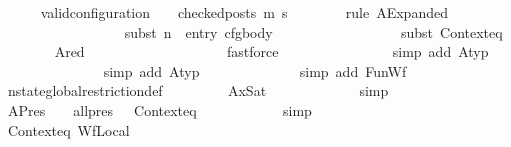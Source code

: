 \begin{isabellebody}
\ \ \ \ \isamarkupfalse%
\ {\isachardoublequoteopen}valid{\isacharunderscore}{\kern0pt}configuration\ {\isasymLambda}\ {\isasymGamma}\ {\isacharbrackleft}{\kern0pt}{\isacharbrackright}{\kern0pt}\ checked{\isacharunderscore}{\kern0pt}posts\ m{\isacharprime}{\kern0pt}\ s{\isacharprime}{\kern0pt}{\isachardoublequoteclose}\isanewline
\ \ \ \ \ \ \isamarkupfalse%
\ {\isacharparenleft}{\kern0pt}rule\ AExpanded{\isacharparenright}{\kern0pt}\isanewline
\ \ \ \ \ \ \ \ \ \ \ \ \ \ \ \ \isamarkupfalse%
\ {\isacharparenleft}{\kern0pt}subst\ {\isacartoucheopen}n\ {\isacharequal}{\kern0pt}\ entry\ cfg{\isacharunderscore}{\kern0pt}body{\isacartoucheclose}{\isacharparenright}{\kern0pt}\isanewline
\ \ \ \ \ \ \ \ \ \ \ \ \ \ \ \ \isamarkupfalse%
\ {\isacharparenleft}{\kern0pt}subst\ Contexteq{\isacharparenright}{\kern0pt}\isanewline
\ \ \ \ \ \ \isamarkupfalse%
\ Ared\ {\isacartoucheopen}{\isasymOmega}\ {\isacharequal}{\kern0pt}\ {\isacharbrackleft}{\kern0pt}{\isacharbrackright}{\kern0pt}{\isacartoucheclose}\isanewline
\ \ \ \ \ \ \ \ \ \ \ \ \ \ \ \isamarkupfalse%
\ fastforce\isanewline
\ \ \ \ \ \ \ \ \ \ \ \ \ \ \isamarkupfalse%
\ {\isacharparenleft}{\kern0pt}simp\ add{\isacharcolon}{\kern0pt}\ Atyp{\isacharparenright}{\kern0pt}\isanewline
\ \ \ \ \ \ \ \ \ \ \ \ \ \isamarkupfalse%
\ {\isacharparenleft}{\kern0pt}simp\ add{\isacharcolon}{\kern0pt}\ Atyp{\isacharparenright}{\kern0pt}\isanewline
\ \ \ \ \ \ \ \ \ \ \ \ \isamarkupfalse%
\ {\isacharparenleft}{\kern0pt}simp\ add{\isacharcolon}{\kern0pt}\ FunWf{\isacharparenright}{\kern0pt}\isanewline
\ \ \ \ \ \ \isamarkupfalse%
\ nstate{\isacharunderscore}{\kern0pt}global{\isacharunderscore}{\kern0pt}restriction{\isacharunderscore}{\kern0pt}def\ \isanewline
\ \ \ \ \ \ \isamarkupfalse%
\ AxSat\isanewline
\ \ \ \ \ \ \ \ \ \ \ \isamarkupfalse%
\ simp\isanewline
\ \ \ \ \ \ \isamarkupfalse%
\ APres\ {\isacartoucheopen}{\isasymOmega}\ {\isacharequal}{\kern0pt}\ {\isacharbrackleft}{\kern0pt}{\isacharbrackright}{\kern0pt}{\isacartoucheclose}\ {\isacartoucheopen}all{\isacharunderscore}{\kern0pt}pres\ {\isacharequal}{\kern0pt}\ {\isacharunderscore}{\kern0pt}{\isacartoucheclose}\ Contexteq\isanewline
\ \ \ \ \ \ \ \ \ \ \isamarkupfalse%
\ simp\isanewline
\ \ \ \ \ \ \isamarkupfalse%
\ Contexteq\ WfLocal\ {\isacartoucheopen}{\isasymOmega}\ {\isacharequal}{\kern0pt}\ {\isacharbrackleft}{\kern0pt}{\isacharbrackright}{\kern0pt}{\isacartoucheclose}\isanewline

\end{isabellebody}
